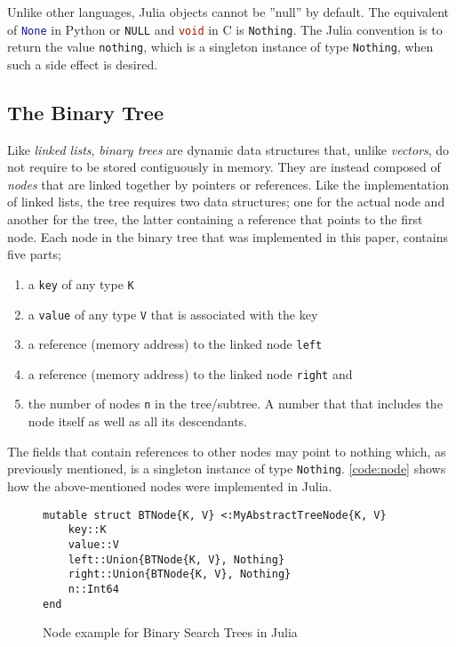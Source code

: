 \documentclass[a4paper, 11pt]{article}
\begin{document}
    Unlike other languages, Julia objects cannot be ''null'' by default. The
    equivalent of \lstinline[language=Python]{None} in Python or
    \lstinline[language=C]{NULL} and \lstinline[language=C]{void} in C is
    \texttt{Nothing}. The Julia convention is to return the value
    \texttt{nothing}, which is a singleton instance of type
    \texttt{Nothing}, when such a side effect is
    desired. 

    \subsection*{The Binary Tree}
    Like \emph{linked lists}, \emph{binary trees} are dynamic data structures that, unlike \emph{vectors}, 
    do not require to be stored contiguously in memory. They are instead composed of \emph{nodes} 
    that are linked together by pointers or references. 
    Like the implementation of linked lists, the tree requires two data structures; one
    for the actual node and another for the tree, the latter containing a
    reference that points to the first node. 
    Each node in the binary tree that was implemented in this paper, contains five parts;
    \begin{enumerate}[itemsep=1pt]
        \item a \texttt{key} of any type \texttt{K}
        \item a \texttt{value} of any type \texttt{V} 
        that is associated with the key
        \item a reference (memory address) to the linked node \texttt{left}
        \item a reference (memory address) to the linked node \texttt{right} and
        \item the number of nodes \texttt{n} in the tree/subtree. 
        A number that that includes the node itself as well as all its descendants.
    \end{enumerate}

    The fields that contain references to other nodes may point to nothing 
    which, as previously mentioned, is a singleton instance of type \texttt{Nothing}.
    \autoref{code:node} shows how the above-mentioned nodes were implemented in Julia. 
    \begin{figure}[H]
        \centering
    \begin{verbatim}
mutable struct BTNode{K, V} <:MyAbstractTreeNode{K, V} 
    key::K
    value::V
    left::Union{BTNode{K, V}, Nothing}
    right::Union{BTNode{K, V}, Nothing}
    n::Int64 
end
    \end{verbatim}
    \caption{Node example for Binary Search Trees in Julia}
    \label{code:node}
    \end{figure}
\end{document}
